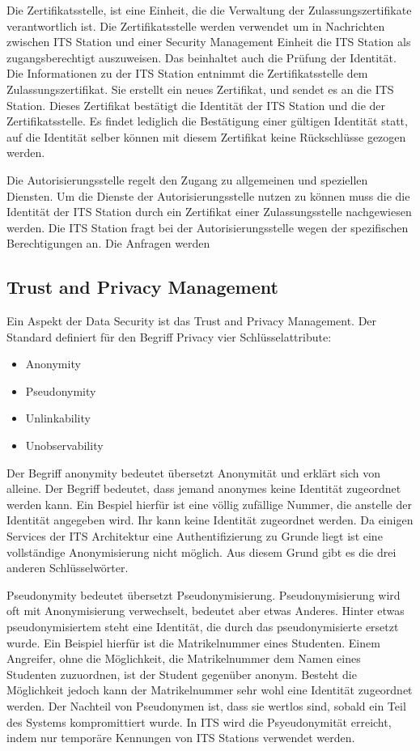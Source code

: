 Die Zertifikatsstelle, ist eine Einheit, die die Verwaltung der Zulassungszertifikate verantwortlich ist. Die Zertifikatsstelle werden verwendet um in Nachrichten zwischen \ac{ITS} Station und einer Security Management Einheit die \ac{ITS} Station als zugangsberechtigt auszuweisen. Das beinhaltet auch die Prüfung der Identität. Die Informationen zu der \ac{ITS} Station entnimmt die Zertifikatsstelle dem Zulassungszertifikat. Sie erstellt ein neues Zertifikat, und sendet es an die \ac{ITS} Station. Dieses Zertifikat bestätigt die Identität der \ac{ITS} Station und die der Zertifikatsstelle. Es findet lediglich die Bestätigung einer gültigen Identität statt,  auf die Identität selber können mit diesem Zertifikat keine Rückschlüsse gezogen werden.

Die Autorisierungsstelle regelt den Zugang zu allgemeinen und speziellen Diensten. Um die Dienste der Autorisierungsstelle nutzen zu können muss die die Identität der \ac{ITS} Station durch ein Zertifikat einer Zulassungsstelle nachgewiesen werden. Die \ac{ITS} Station fragt bei der Autorisierungsstelle wegen der spezifischen Berechtigungen an. Die Anfragen werden 

\subsection{Trust and Privacy Management}

Ein Aspekt der Data Security ist das Trust and Privacy Management. Der Standard \cite{ts102941} definiert für  den Begriff Privacy vier Schlüsselattribute:
\begin{itemize}
	\item Anonymity
	\item Pseudonymity
	\item Unlinkability
	\item Unobservability
\end{itemize}

Der Begriff anonymity bedeutet übersetzt Anonymität und erklärt sich von alleine. Der Begriff bedeutet, dass jemand anonymes keine Identität zugeordnet werden kann. Ein Bespiel hierfür ist eine völlig zufällige Nummer, die anstelle der Identität angegeben wird. Ihr kann keine Identität zugeordnet werden. Da einigen Services der \ac{ITS} Architektur eine Authentifizierung zu Grunde liegt ist eine vollständige Anonymisierung nicht möglich. Aus diesem Grund gibt es die drei anderen Schlüsselwörter. 

Pseudonymity bedeutet übersetzt Pseudonymisierung.  Pseudonymisierung wird oft mit Anonymisierung verwechselt, bedeutet aber etwas Anderes. Hinter etwas pseudonymisiertem steht eine Identität, die durch das  pseudonymisierte ersetzt wurde. Ein Beispiel hierfür ist die Matrikelnummer eines Studenten. Einem Angreifer, ohne die Möglichkeit, die Matrikelnummer dem Namen eines Studenten zuzuordnen, ist der Student gegenüber anonym. Besteht die Möglichkeit jedoch kann der Matrikelnummer sehr wohl eine Identität zugeordnet werden. Der Nachteil von Pseudonymen ist, dass sie wertlos sind, sobald ein Teil des Systems kompromittiert wurde. In \ac{ITS} wird die  Psyeudonymität erreicht, indem nur temporäre Kennungen von \ac{ITS} Stations verwendet werden.

